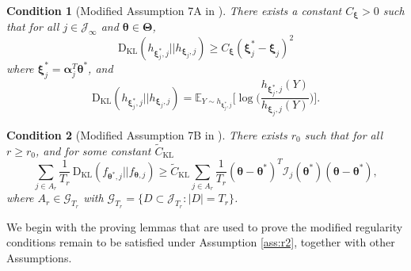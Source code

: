 \documentclass[12pt]{article}
\newcommand{\bfTheta}{\boldsymbol{\Theta}}
\newcommand{\bfalpha}{\boldsymbol{\alpha}}
\newcommand{\bftheta}{\boldsymbol{\theta}}
\newcommand{\bfxi}{\boldsymbol{\xi}}
\newtheorem{condition}{Condition}[section]
\begin{document}
\begin{condition}[Modified Assumption 7A in ] \label{c:c7a'}
There exists a constant $C_{\bfxi} > 0$ such that for all $j \in \mathcal{J}_{\infty}$ and $\bftheta \in \bfTheta$, 
\begin{equation*}
\mathrm{D}_{\mathrm{KL}}(h_{\bfxi_j^{\ast}, j} || h_{\bfxi_j, j}) \geq C_{\bfxi} ( \bfxi_j^{\ast} - \bfxi_j )^2
\end{equation*}
where $\bfxi_j^{\ast} = \bfalpha_j^T \bftheta^{\ast}$, and 
\begin{equation*}
\mathrm{D}_{\mathrm{KL}}( h_{\bfxi_j^{\ast}, j} || h_{\bfxi_j, j}) = \mathbb{E}_{Y \sim h_{\bfxi_j^{\ast}, j}} \Big[ \log \Big( \frac{h_{\bfxi_j^{\ast},j}(Y)}{h_{\bfxi_j, j}(Y)} \Big) \Big].
\end{equation*}
\end{condition}

\begin{condition}[Modified Assumption 7B in ] \label{c:c7b'}
There exists $r_0$ such that for all $r \geq r_0$, and for some constant $\tilde{C}_{\mathrm{KL}}$ 
\begin{equation*}
\sum_{j \in A_r} \frac{1}{T_r} \, \mathrm{D}_{\mathrm{KL}}( f_{\bftheta^{\ast},j} || f_{\bftheta, j} ) 
\geq \tilde{C}_{\mathrm{KL}} \sum_{j \in A_r } \frac{1}{T_r} (\bftheta - \bftheta^{\ast})^T \mathcal{I}_{j}(\bftheta^{\ast}) (\bftheta - \bftheta^{\ast}),
\end{equation*}
where $A_r \in \mathcal{G}_{T_r}$ with $\mathcal{G}_{T_r} = \{ D \subset \mathcal{J}_{T_r} : |D| = T_r \}$.
\end{condition}



We begin with the proving lemmas that are used to prove the modified regularity conditions remain to be satisfied under Assumption \ref{ass:r2}, together with other Assumptions.  
\end{document}
